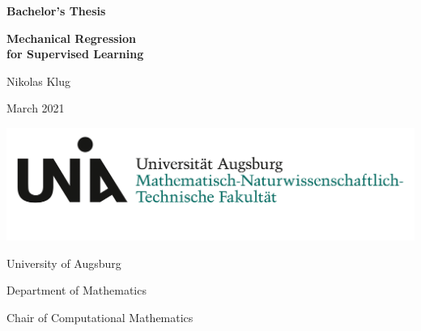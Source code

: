 \begin{titlepage}
	\centering
	
	\large{\textbf{Bachelor's Thesis}}
	\vspace{0.4cm}
	
	\huge{\textbf{Mechanical Regression \\for Supervised Learning}}\par
	
	\vspace{1cm}
	\Large{Nikolas Klug}
	
	\vspace{1cm}
	\Large{March 2021}
	
	\vspace{\fill}
	\includegraphics[scale=0.5]{figures/Uni_Aug_Logo_MNTF_RGB.png}
	\vspace{5mm}
	
	University of Augsburg
	
	Department of Mathematics
	
	Chair of Computational Mathematics
\end{titlepage}

\normalfont
\restoregeometry
\pagebreak

